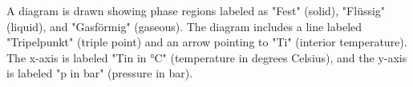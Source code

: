A diagram is drawn showing phase regions labeled as "Fest" (solid), "Flüssig" (liquid), and "Gasförmig" (gaseous). The diagram includes a line labeled "Tripelpunkt" (triple point) and an arrow pointing to "Ti" (interior temperature). The x-axis is labeled "Tin in °C" (temperature in degrees Celsius), and the y-axis is labeled "p in bar" (pressure in bar).